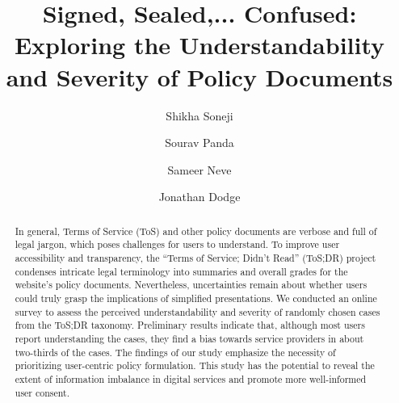 \title{
Signed, Sealed,... Confused: Exploring the Understandability and Severity of Policy Documents
}


\author{Shikha Soneji}

\author{Sourav Panda}

\author{Sameer Neve}

\author{Jonathan Dodge}




\renewcommand{\shortauthors}{S.\ Soneji, S.\ Panda, S.\ Neve, and J.\ Dodge}



\begin{abstract}
In general, Terms of Service (ToS) and other policy documents are verbose and full of legal jargon, which poses challenges for users to understand.
To improve user accessibility and transparency, the ``Terms of Service; Didn't Read'' (ToS;DR) project condenses intricate legal terminology into summaries and overall grades for the website's policy documents.
Nevertheless, uncertainties remain about whether users could truly grasp the implications of simplified presentations.
We conducted an online survey to assess the perceived understandability and severity of randomly chosen cases from the ToS;DR taxonomy.
Preliminary results indicate that, although most users report understanding the cases, they find a bias towards service providers in about two-thirds of the cases.
The findings of our study emphasize the necessity of prioritizing user-centric policy formulation.
This study has the potential to reveal the extent of information imbalance in digital services and promote more well-informed user consent.
\end{abstract}


